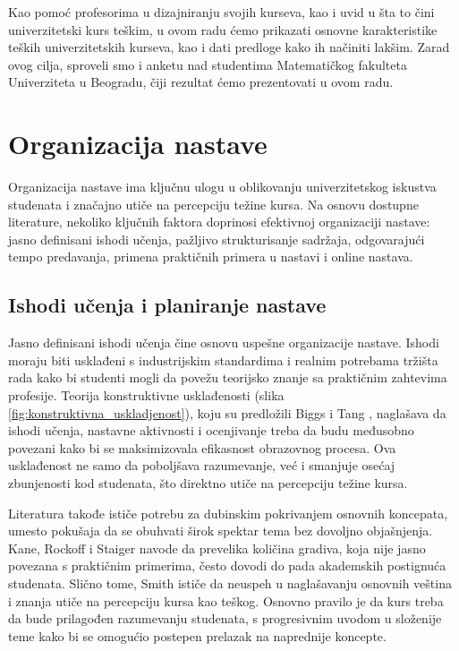 \documentclass[a4paper]{article}
\begin{document}
Kao pomoć profesorima u dizajniranju svojih kurseva, kao i uvid u šta to čini univerzitetski kurs teškim, u ovom radu ćemo prikazati osnovne karakteristike teških univerzitetskih kurseva, kao i dati predloge kako ih načiniti lakšim. Zarad ovog cilja, sproveli smo i anketu nad studentima Matematičkog fakulteta Univerziteta u Beogradu, čiji rezultat ćemo prezentovati u ovom radu.

\section{Organizacija nastave}
Organizacija nastave ima ključnu ulogu u oblikovanju univerzitetskog iskustva studenata i
značajno utiče na percepciju težine kursa. Na osnovu dostupne literature, nekoliko ključnih
faktora doprinosi efektivnoj organizaciji nastave: jasno definisani ishodi učenja, pažljivo
strukturisanje sadržaja, odgovarajući tempo predavanja, primena praktičnih primera u
nastavi i online nastava.

\subsection{Ishodi učenja i planiranje nastave}
Jasno definisani ishodi učenja čine osnovu uspešne organizacije nastave. Ishodi moraju biti
usklađeni s industrijskim standardima i realnim potrebama tržišta rada kako bi studenti mogli
da povežu teorijsko znanje sa praktičnim zahtevima profesije. Teorija konstruktivne
usklađenosti (slika \ref{fig:konstruktivna_uskladjenost}), koju su predložili Biggs i Tang \cite{biggs2007teaching}, naglašava da ishodi učenja, nastavne
aktivnosti i ocenjivanje treba da budu međusobno povezani kako bi se maksimizovala
efikasnost obrazovnog procesa. Ova usklađenost ne samo da poboljšava razumevanje, već i
smanjuje osećaj zbunjenosti kod studenata, što direktno utiče na percepciju težine kursa.

Literatura takođe ističe potrebu za dubinskim pokrivanjem osnovnih koncepata, umesto
pokušaja da se obuhvati širok spektar tema bez dovoljno objašnjenja. Kane, Rockoff i
Staiger \cite{kane2006certification} navode da prevelika količina gradiva, koja nije jasno povezana s praktičnim
primerima, često dovodi do pada akademskih postignuća studenata. Slično tome, Smith
\cite{smith2009simulation} ističe da neuspeh u naglašavanju osnovnih veština i znanja utiče na percepciju kursa
kao teškog. Osnovno pravilo je da kurs treba da bude prilagođen razumevanju
studenata, s progresivnim uvodom u složenije teme kako bi se omogućio postepen prelazak
na naprednije koncepte.
\end{document}

